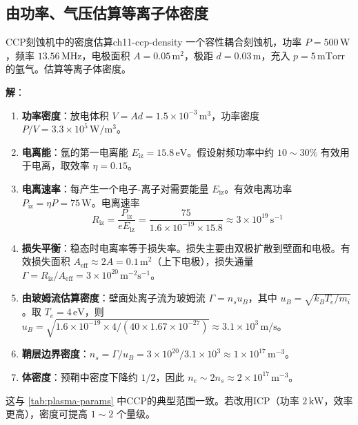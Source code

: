 \documentclass[12pt,a4paper,openany,oneside]{book}
\newcommand{\difficulty}[1]{\marginnote{\hfill\textcolor{coverMid!80}{\rule[-0.1em]{2pt}{0.9em}}\,\textcolor{coverMid}{\footnotesize\textbf{[#1]}}}}
\begin{document}
\subsection{由功率、气压估算等离子体密度}

\begin{example}{CCP刻蚀机中的密度估算}{ch11-ccp-density}
\label{ex:density-estimation}
\difficulty{基础}
一个容性耦合刻蚀机，功率 $P = 500\,\mathrm{W}$，频率 $13.56\,\mathrm{MHz}$，电极面积 $A = 0.05\,\mathrm{m^2}$，极距 $d = 0.03\,\mathrm{m}$，充入 $p = 5\,\mathrm{mTorr}$ 的氩气。估算等离子体密度。

\textbf{解}：
\begin{enumerate}
\item \textbf{功率密度}：放电体积 $V = A d = 1.5\times 10^{-3}\,\mathrm{m^3}$，功率密度 $P/V = 3.3\times 10^5\,\mathrm{W/m^3}$。
\item \textbf{电离能}：氩的第一电离能 $E_{\text{iz}} = 15.8\,\mathrm{eV}$。假设射频功率中约 $10\sim 30\%$ 有效用于电离，取效率 $\eta = 0.15$。
\item \textbf{电离速率}：每产生一个电子-离子对需要能量 $E_{\text{iz}}$。有效电离功率 $P_{\text{iz}} = \eta P = 75\,\mathrm{W}$。电离速率
\begin{equation}
R_{\text{iz}} = \frac{P_{\text{iz}}}{e E_{\text{iz}}} = \frac{75}{1.6\times 10^{-19} \times 15.8} \approx 3\times 10^{19}\,\mathrm{s^{-1}}
\end{equation}
\item \textbf{损失平衡}：稳态时电离率等于损失率。损失主要由双极扩散到壁面和电极。有效损失面积 $A_{\text{eff}} \approx 2A = 0.1\,\mathrm{m^2}$（上下电极），损失通量 $\Gamma = R_{\text{iz}}/A_{\text{eff}} = 3\times 10^{20}\,\mathrm{m^{-2}s^{-1}}$。
\item \textbf{由玻姆流估算密度}：壁面处离子流为玻姆流 $\Gamma = n_s u_B$，其中 $u_B = \sqrt{k_B T_e/m_i}$。取 $T_e = 4\,\mathrm{eV}$，则 $u_B = \sqrt{1.6\times 10^{-19}\times 4/(40\times 1.67\times 10^{-27})} \approx 3.1\times 10^3\,\mathrm{m/s}$。
\item \textbf{鞘层边界密度}：$n_s = \Gamma/u_B = 3\times 10^{20}/3.1\times 10^3 \approx 1\times 10^{17}\,\mathrm{m^{-3}}$。
\item \textbf{体密度}：预鞘中密度下降约 $1/2$，因此 $n_e \sim 2 n_s \approx 2\times 10^{17}\,\mathrm{m^{-3}}$。
\end{enumerate}

这与 \cref{tab:plasma-params} 中CCP的典型范围一致。若改用ICP（功率 $2\,\mathrm{kW}$，效率更高），密度可提高 $1\sim 2$ 个量级。
\end{example}
\end{document}
